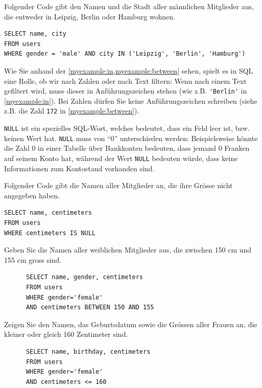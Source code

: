 \begin{myexample}\label{myexample:in}
Folgender Code gibt den Namen und die Stadt aller männlichen Mitglieder aus, die entweder in Leipzig, Berlin oder Hamburg wohnen.

\begin{lstlisting}
SELECT name, city
FROM users
WHERE gender = 'male' AND city IN ('Leipzig', 'Berlin', 'Hamburg')
\end{lstlisting}
\end{myexample}


\begin{mycaution}
Wie Sie anhand der \cref{myexample:in,myexample:between} sehen, spielt es in SQL eine Rolle, ob wir nach Zahlen oder nach
  Text filtern: Wenn nach einem Text gefiltert wird, muss dieser in Anführungszeichen stehen (wie z.B.
  \lstinline|'Berlin'| in \cref{myexample:in}). Bei Zahlen dürfen Sie keine Anführungszeichen schreiben (siehe z.B. die Zahl
  \lstinline|172| in \cref{myexample:between}).
\end{mycaution}

\lstinline|NULL| ist ein spezielles \gls{SQL}-Wort, welches bedeutet, dass ein Feld leer ist, bzw. keinen
Wert hat. \lstinline|NULL| muss von \enquote{0} unterschieden werden: Beispielsweise könnte die Zahl 0 in einer
Tabelle über Bankkonten bedeuten, dass jemand 0 Franken auf seinem Konto hat, während der Wert \lstinline|NULL| bedeuten würde, dass keine
Informationen zum Kontostand vorhanden sind.

\begin{myexample}
  Folgender Code gibt die Namen aller Mitglieder an, die ihre Grösse nicht angegeben haben.
\begin{lstlisting}
SELECT name, centimeters
FROM users
WHERE centimeters IS NULL
\end{lstlisting}
\end{myexample}


\begin{myexercise}
  Geben Sie die Namen aller weiblichen Mitglieder aus, die zwischen 150 cm und 155 cm gross sind.
  \begin{myanswer}
    \begin{lstlisting}
      SELECT name, gender, centimeters
      FROM users
      WHERE gender='female'
      AND centimeters BETWEEN 150 AND 155
    \end{lstlisting}
  \end{myanswer}
\end{myexercise}
\begin{myexercise}
  Zeigen Sie den Namen, das Geburtsdatum sowie die Grössen aller Frauen an, die kleiner oder gleich 160 Zentimeter sind.
  \begin{myanswer}
    \begin{lstlisting}
      SELECT name, birthday, centimeters
      FROM users
      WHERE gender='female'
      AND centimeters <= 160
    \end{lstlisting}
  \end{myanswer}
\end{myexercise}

